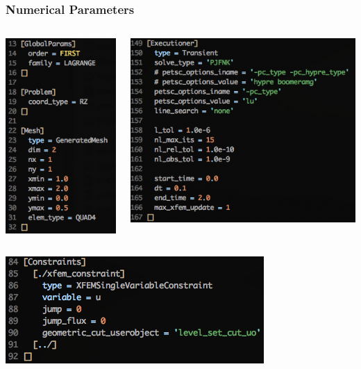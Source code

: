 \documentclass[]{beamer}
\begin{document}
\begin{frame}\frametitle{Numerical Parameters}
  	\begin{columns}
			\begin{center}
			\includegraphics[scale=0.4]{figures/Screen-GlobalParams-1Drzls1m}
			\end{center}
			\begin{center}
			\includegraphics[scale=0.4]{figures/Screen-Executioner-1Drzls1m}
			\end{center}
	\end{columns}
	\begin{center}
	\includegraphics[scale=0.4]{figures/Screen-Constraints-1Drzls1m}
	\end{center}
\end{frame}
\end{document}

